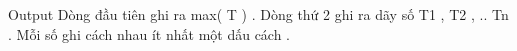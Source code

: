 Output
Dòng đầu tiên ghi ra max( T ) . Dòng thứ 2 ghi ra dãy số T1 , T2 , .. Tn . Mỗi số ghi cách nhau ít nhất một dấu cách .